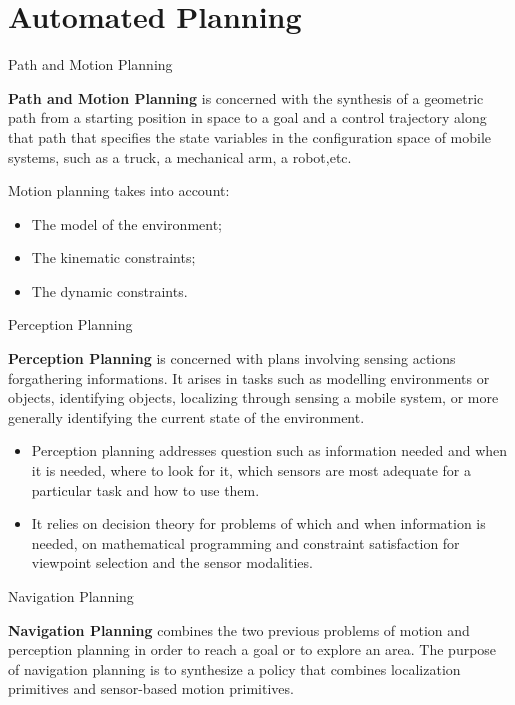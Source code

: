 \documentclass[9pt]{beamer}
\begin{document}
\section{Automated Planning}


\begin{frame}{Path and Motion Planning}
\begin{small}

\textcolor{CS-1light}{\textbf{Path and Motion Planning}} is concerned with the synthesis of a geometric path from a starting position in space to a goal and a control trajectory along that path that specifies the state variables in the configuration space of mobile systems, such as a truck, a mechanical arm, a robot,etc.

Motion planning takes into account:
\begin{itemize}
\item The model of the environment;
\item The kinematic constraints;
\item The dynamic constraints.
\end{itemize}
\end{small}
\end{frame}

\begin{frame}{Perception Planning}
\begin{small}
\textcolor{CS-1light}{\textbf{Perception Planning}} is concerned with plans involving sensing actions forgathering informations. It arises in tasks such as modelling environments or objects, identifying objects, localizing through sensing a mobile system, or more generally identifying the current state of the environment.

\begin{itemize}
\item Perception planning addresses question such as information needed and when it is needed, where to look for it, which sensors are most adequate for a particular task and how to use them.

\item It relies on decision theory for problems of which and when information is needed, on mathematical programming and constraint satisfaction for viewpoint selection and the sensor modalities.
\end{itemize}
\end{small}
\end{frame}

\begin{frame}{Navigation Planning}
\begin{small}
\textcolor{CS-1light}{\textbf{Navigation Planning}} combines the two previous problems of motion and perception planning in order to reach a goal or to explore an area. The purpose of navigation planning is to synthesize a policy that combines localization primitives and sensor-based motion primitives.
\end{small}
\end{frame}
\end{document}
